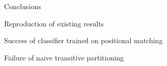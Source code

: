 \documentclass[12pt]{beamer}
\begin{document}
\begin{frame}{Conclusions}
\begin{block}{Reproduction of existing results}
\end{block}
\begin{exampleblock}{Success of classifier trained on positional matching}
\end{exampleblock}
\begin{alertblock}{Failure of naive transitive partitioning}
\end{alertblock}
\end{frame}

\begin{frame}
\titlepage 
\end{frame}
\end{document}
